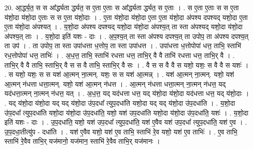 \documentclass[17pt]{extarticle}
\begin{document}
20. आ॒र्द्ध्य॒त॒ स स आ᳚र्द्ध्यता र्द्ध्यत॒ स ए॒ता ए॒ताः स आ᳚र्द्ध्यता र्द्ध्यत॒ स ए॒ताः । . स ए॒ता ए॒ताः स स ए॒ता य॑शो॒दा य॑शो॒दा ए॒ताः स स ए॒ता य॑शो॒दाः । . ए॒ता य॑शो॒दा य॑शो॒दा ए॒ता ए॒ता य॑शो॒दा अ॑पश्य दपश्यद् यशो॒दा ए॒ता ए॒ता य॑शो॒दा अ॑पश्यत् । . य॒शो॒दा अ॑पश्य दपश्यद् यशो॒दा य॑शो॒दा अ॑पश्य॒त् ता स्ता अ॑पश्यद् यशो॒दा य॑शो॒दा अ॑पश्य॒त् ताः । . य॒शो॒दा इति॑ यशः - दाः । . अ॒प॒श्य॒त् ता स्ता अ॑पश्य दपश्य॒त् ता उपोप॒ ता अ॑पश्य दपश्य॒त् ता उप॑ । . ता उपोप॒ ता स्ता उपा॑धत्ता ध॒त्तोप॒ ता स्ता उपा॑धत्त । . उपा॑धत्ता ध॒त्तोपोपा॑ धत्त॒ ताभि॒ स्ताभि॑ रध॒त्तोपोपा॑ धत्त॒ ताभिः॑ । . अ॒ध॒त्त॒ ताभि॒ स्ताभि॑ रधत्ता धत्त॒ ताभि॒र् वै वै ताभि॑ रधत्ता धत्त॒ ताभि॒र् वै । . ताभि॒र् वै वै ताभि॒ स्ताभि॒र् वै स स वै ताभि॒ स्ताभि॒र् वै सः । . वै स स वै वै स यशो॒ यशः॒ स वै वै स यशः॑ । . स यशो॒ यशः॒ स स यश॑ आ॒त्मन् ना॒त्मन्. यशः॒ स स यश॑ आ॒त्मन्न् । . यश॑ आ॒त्मन् ना॒त्मन्. यशो॒ यश॑ आ॒त्मन् न॑धत्ता धत्ता॒त्मन्. यशो॒ यश॑ आ॒त्मन् न॑धत्त । . आ॒त्मन् न॑धत्ता धत्ता॒त्मन् ना॒त्मन् न॑धत्त॒ यद् यद॑धत्ता॒त्मन् ना॒त्मन् न॑धत्त॒ यत् । . अ॒ध॒त्त॒ यद् यद॑धत्ता धत्त॒ यद् य॑शो॒दा य॑शो॒दा यद॑धत्ता धत्त॒ यद् य॑शो॒दाः । . यद् य॑शो॒दा य॑शो॒दा यद् यद् य॑शो॒दा उ॑प॒दधा᳚ त्युप॒दधा॑ति यशो॒दा यद् यद् य॑शो॒दा उ॑प॒दधा॑ति । . य॒शो॒दा उ॑प॒दधा᳚ त्युप॒दधा॑ति यशो॒दा य॑शो॒दा उ॑प॒दधा॑ति॒ यशो॒ यश॑ उप॒दधा॑ति यशो॒दा य॑शो॒दा उ॑प॒दधा॑ति॒ यशः॑ । . य॒शो॒दा इति॑ यशः - दाः । . उ॒प॒दधा॑ति॒ यशो॒ यश॑ उप॒दधा᳚ त्युप॒दधा॑ति॒ यश॑ ए॒वैव यश॑ उप॒दधा᳚ त्युप॒दधा॑ति॒ यश॑ ए॒व । . उ॒प॒दधा॒तीत्यु॑प - दधा॑ति । . यश॑ ए॒वैव यशो॒ यश॑ ए॒व ताभि॒ स्ताभि॑ रे॒व यशो॒ यश॑ ए॒व ताभिः॑ । . ए॒व ताभि॒ स्ताभि॑ रे॒वैव ताभि॒र् यज॑मानो॒ यज॑मान॒ स्ताभि॑ रे॒वैव ताभि॒र् यज॑मानः । \newline
\end{document}
